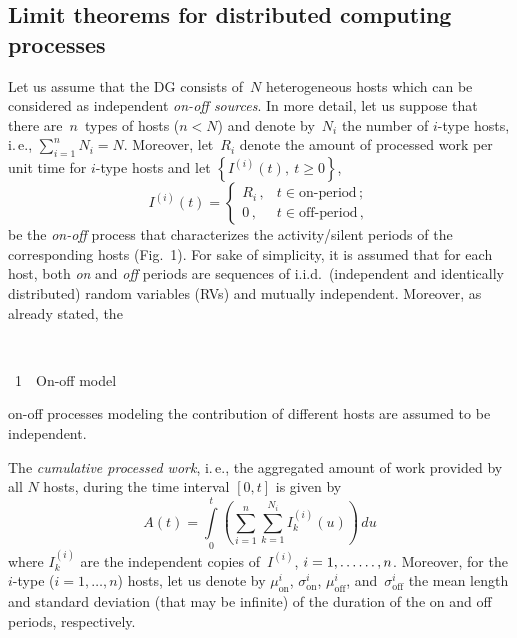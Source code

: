 \begin{multicols}{2}
\subsection{Limit theorems for distributed computing processes}



\noindent
Let us assume that the DG consists of~$N$ heterogeneous hosts which can be 
considered as  independent \textit{on-off sources}. In more detail, let us suppose 
that there are~$n$~types of hosts ($n<N$) and denote by~$N_i$ the number of  
$i$-type hosts, i.\,e., $\sum\nolimits_{i=1}^n N_i=N$. 
Moreover, let~$R_i$ denote the amount of processed work per unit time for $i$-type 
hosts and let $\left\{I^{(i)}(t),\ t\geq0\right\}$,
\begin{equation*}
I^{(i)}(t)=\begin{cases}
 R_i\,, &t\in \mbox{on-period}\,; \\
 0\,, & t\in \mbox{off-period}\,, 
\end{cases}
\end{equation*}
be the  \textit{on-off} process that characterizes the activity/silent 
periods of the corresponding hosts (Fig.~1).
For sake  of simplicity, it is assumed that for each host, both \textit{on} 
and  \textit{off} periods are sequences of i.i.d.\ (independent
and identically distributed)
random variables (RVs) and mutually independent.
Moreover, as already stated, the\linebreak\vspace*{-12pt}

{ \begin{center}  %
 \vspace*{9pt}
   \mbox{%
 \epsfxsize=79mm 
 }


\vspace*{6pt}


\noindent
{{\figurename~1}\ \ \small{On-off model}}
\end{center}
}


\addtocounter{figure}{1}


\noindent
on-off processes modeling the contribution of 
different hosts are assumed to be independent.



The \textit{cumulative processed work}, i.\,e., the aggregated amount of  
work provided by all $N$ hosts, during the time interval $[0,t]$ is given by
$$
A(t)=\int\limits_0^{t} \left( {\sum\limits_{i=1}^n\sum\limits_{k=1}^{N_i} 
{I_{k}^{(i)}(u)} } \right)\,du
$$
where $I_k^{(i)}$ are the independent copies of~$I^{(i)}$, $i=1,\ldots\linebreak \ldots,n$. 
Moreover, for the $i$-type ($i=1,\dots,n$) hosts, let us denote by
$\mu_{\mathrm{on}}^i$, $\sigma_{\mathrm{on}}^i$, $\mu_{\mathrm{off}}^i$, 
and~$\sigma_{\mathrm{off}}^i$
the mean length and  standard deviation (that may be infinite) of 
the duration of the  on and  off periods, respectively.



\end{multicols}
